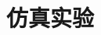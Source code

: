\documentclass[UTF8, aspectratio=169, 9pt]{ctexbeamer}
\begin{document}
\section{仿真实验}
\begin{frame}



\end{frame}
\end{document}
